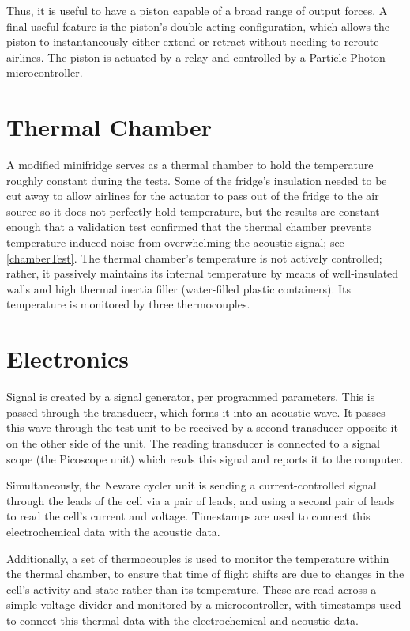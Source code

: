 Thus, it is useful to have a piston capable of a broad range of output forces. A final useful feature is the piston's double acting configuration, which allows the piston to instantaneously either extend or retract without needing to reroute airlines. The piston is actuated by a relay and controlled by a Particle Photon microcontroller.

\section{Thermal Chamber}\label{thermalChamber}
A modified minifridge serves as a thermal chamber to hold the temperature roughly constant during the tests. 
Some of the fridge's insulation needed to be cut away to allow airlines for the actuator to pass out of the fridge to the air source so it does not perfectly hold temperature, but the results are constant enough that a validation test confirmed that the thermal chamber prevents temperature-induced noise from overwhelming the acoustic signal; see \hyperref[chamberTest]{\cref{chamberTest}}.  
The thermal chamber's temperature is not actively controlled; rather, it passively maintains its internal temperature by means of well-insulated walls and high thermal inertia filler (water-filled plastic containers). 
Its temperature is monitored by three thermocouples.

\section{Electronics}


Signal is created by a signal generator, per programmed parameters. This is passed through the transducer, which forms it into an acoustic wave. It passes this wave through the test unit to be received by a second transducer opposite it on the other side of the unit. The reading transducer is connected to a signal scope (the Picoscope unit) which reads this signal and reports it to the computer.

Simultaneously, the Neware cycler unit is sending a current-controlled signal through the leads of the cell via a pair of leads, and using a second pair of leads to read the cell's current and voltage. Timestamps are used to connect this electrochemical data with the acoustic data.

Additionally, a set of thermocouples is used to monitor the temperature within the thermal chamber, to ensure that time of flight shifts are due to changes in the cell's activity and state rather than its temperature. These are read across a simple voltage divider and monitored by a microcontroller, with timestamps used to connect this thermal data with the electrochemical and acoustic data.

